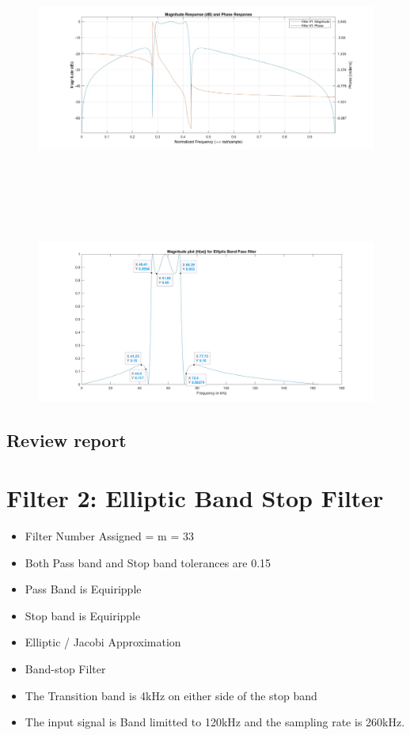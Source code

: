 \documentclass[12pt]{article}
\begin{document}
\begin{figure}[H]
	\centering
	\includegraphics[width = 18cm, height = 10cm]{Filter3MagPhase.jpg}
\end{figure}
\begin{figure}[H]
	\centering
	\includegraphics[width = 18cm, trim=0cm 0cm 0cm 0cm, clip]{Filter3DBPF.jpg}
\end{figure}

\color{cyan}
\subsection{Review report}
\color{black}
\newpage

\color{darkblue}
\section{Filter 2: Elliptic Band Stop Filter}
\color{black}
\begin{itemize}
	\item Filter Number Assigned = m = 33
	\item Both Pass band and Stop band tolerances are 0.15
	\item Pass Band is Equiripple 
	\item Stop band is Equiripple 
	\item Elliptic / Jacobi Approximation
	\item Band-stop Filter
	\item The Transition band is 4kHz on either side of the stop band
	\item The input signal is Band limitted to 120kHz and the sampling rate is 260kHz.
\end{itemize}
\color{cyan}
\end{document}
